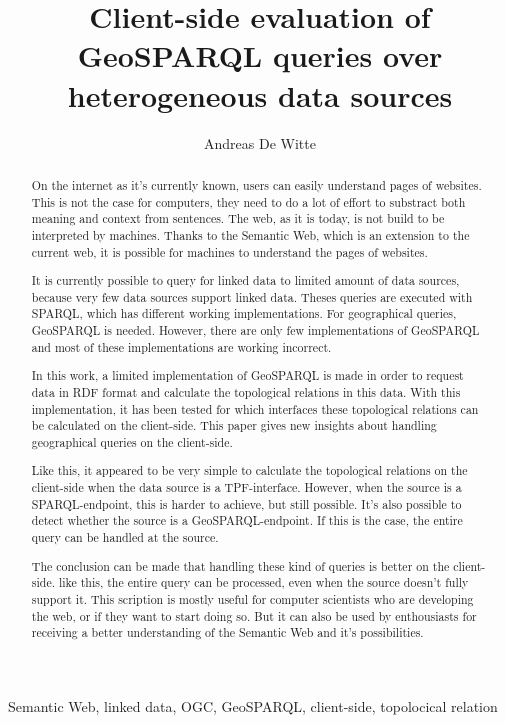 \documentclass[twocolumn]{phdsymp} %
\begin{document}
\title{Client-side evaluation of GeoSPARQL queries over heterogeneous data sources} %

\author{Andreas De Witte}


\maketitle

\begin{abstract}
    On the internet as it's currently known, users can easily understand pages of websites. This is not the case for computers, they need to do a lot of effort to substract both meaning and context from sentences. The web, as it is today, is not build to be interpreted by machines. Thanks to the Semantic Web, which is an extension to the current web, it is possible for machines to understand the pages of websites.

    It is currently possible to query for linked data to limited amount of data sources, because very few data sources support linked data. Theses queries are executed with SPARQL, which has different working implementations. For geographical queries, GeoSPARQL is needed. However, there are only few implementations of GeoSPARQL and most of these implementations are working incorrect.

    In this work, a limited implementation of GeoSPARQL is made in order to request data in RDF format and calculate the topological relations in this data. With this implementation, it has been tested for which interfaces these topological relations can be calculated on the client-side. This paper gives new insights about handling geographical queries on the client-side.

    Like this, it appeared to be very simple to calculate the topological relations on the client-side when the data source is a TPF-interface. However, when the source is a SPARQL-endpoint, this is harder to achieve, but still possible. It's also possible to detect whether the source is a GeoSPARQL-endpoint. If this is the case, the entire query can be handled at the source.
    
    The conclusion can be made that handling these kind of queries is better on the client-side. like this, the entire query can be processed, even when the source doesn't fully support it. This scription is mostly useful for computer scientists who are developing the web, or if they want to start doing so. But it can also be used by enthousiasts for receiving a better understanding of the Semantic Web and it's possibilities.
\end{abstract}

\begin{keywords}
    Semantic Web, linked data, OGC, GeoSPARQL, client-side, topolocical relation
\end{keywords}
\end{document}
